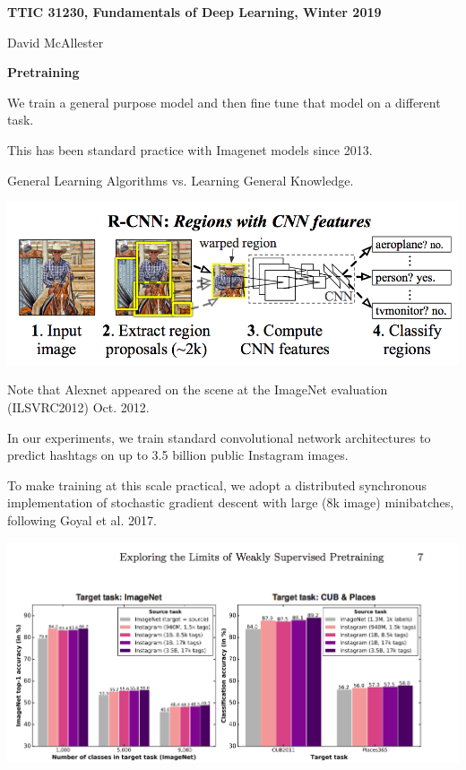 





{\Huge
  \centerline{\bf TTIC 31230,  Fundamentals of Deep Learning, Winter 2019}
  \vfill
  \centerline{David McAllester}
  \vfill
  \centerline{\bf Pretraining}



\vfill
We train a general purpose model and then fine tune that model on a different task.

\vfill
This has been standard practice with Imagenet models since 2013.

\vfill
General Learning Algorithms vs. Learning General Knowledge.


\centerline{\includegraphics[width=10.0 in]{../images/R-CNN}}

Note that Alexnet appeared on the scene at the ImageNet evaluation (ILSVRC2012) Oct. 2012.


In our experiments, we train standard convolutional network architectures to
predict hashtags on up to 3.5 billion public Instagram images.

\vfill
To make training at this scale practical, we adopt a distributed synchronous implementation of
stochastic gradient descent with large (8k image) minibatches, following Goyal et al. 2017.


\centerline{\includegraphics[width=10.0 in]{../images/InstagramPre}}

}
